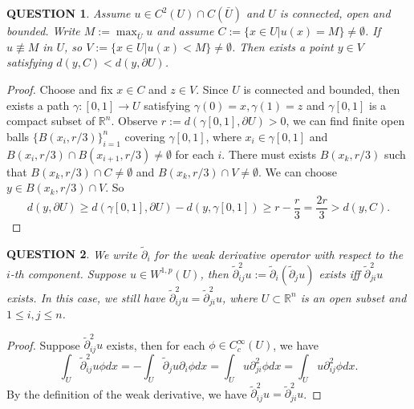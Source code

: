 \documentclass[12pt]{article}
\renewcommand{\(}{\left(}%
\renewcommand{\)}{\right)}%
\renewcommand{\[}{\left[}%
\renewcommand{\]}{\right]}%
\renewcommand{\r}{\mathbb{R}}
\newtheorem{question}{QUESTION}[section]}
\newtheorem{proof}{Proof.}}
\begin{document}
  \begin{question}
   Assume $u\in C^2(U)\cap C(\bar{U})$ and $U$ is connected, open and bounded. Write $M:=\max_{\bar{U}}u$ and assume $C:=\{x\in U|u(x)=M\}\neq\emptyset$. If $u\not\equiv M$ in $U$, so $V:=\{x\in U|u(x)<M\}\neq \emptyset$. Then exists a point $y\in V$ satisfying $d(y,C)<d(y,\partial U )$.
  \end{question}
  \begin{proof}
    Choose and fix $x\in C$ and $z\in V$. Since $U$ is connected and bounded, then exists a path $\gamma:[0,1]\to U$ satisfying $\gamma(0)=x,\gamma(1)=z$ and $\gamma[0,1]$ is a compact subset of $\r^n$. Observe $r:= d(\gamma[0,1],\partial U)>0$, we can find finite open balls $\{B(x_i,r/3 )\}_{i=1}^n$ covering $\gamma[0,1]$, where $x_i\in \gamma[0,1]$ and $B(x_i,r/3 )\cap B(x_{i+1},r/3 )\neq\emptyset$ for each $i$. There must exists $B(x_k,r/3)$ such that $B(x_k,r/3)\cap C\neq\emptyset$ and $B(x_k,r/3)\cap V\neq\emptyset$. We can choose $y\in B(x_k,r/3)\cap V$. So
    \begin{equation*}
     d(y,\partial U)\geq d(\gamma[0,1],\partial U )- d(y,\gamma[0,1] )\geq r-\frac{r}{3}=\frac{2r}{3}>d(y,C).
    \end{equation*}
  \end{proof}

  \begin{question}
   We write $\widetilde{\partial}_i$ for the weak derivative operator with respect to the $i$-th component. Suppose $u\in W^{1,p}(U)$, then $\widetilde{\partial}_{ij}^2u:=\widetilde{\partial}_i(\widetilde{\partial}_j u)$ exists iff $\widetilde{\partial}_{ji}^2u$ exists. In this case, we still have $\widetilde{\partial}_{ij}^2u=\widetilde{\partial}_{ji}^2u$, where $U\subset\r^n$ is an open subset and $1\leq i,j\leq n$.
  \end{question}
  \begin{proof}
   Suppose $\widetilde{\partial}_{ij}^2u$ exists, then for each $\phi\in C^\infty_c(U)$, we have
   \begin{equation*}
    \int_U \widetilde{\partial}_{ij}^2u \phi dx=-\int_U\widetilde{\partial}_{j}u\partial_i\phi dx=\int_Uu \partial_{ji}^2\phi dx=\int_Uu \partial_{ij}^2\phi dx.
   \end{equation*}
   By the definition of the weak derivative, we have $\widetilde{\partial}_{ij}^2u=\widetilde{\partial}_{ji}^2u$.
  \end{proof}
\end{document}
